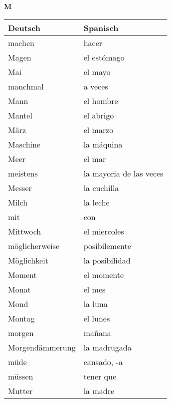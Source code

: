 \begin{flushright}\begin{Huge}\textbf{M}\end{Huge}\end{flushright}

\begin{longtable}{p{} p{}} 
\textbf{Deutsch}     & \textbf{Spanisch}                                       \\ \hline
\hline
\endhead %
machen & hacer\\
Magen & el estómago\\
Mai & el mayo\\
manchmal & a veces\\
Mann & el hombre\\
Mantel & el abrigo\\
März & el marzo\\
Maschine & la máquina\\
Meer & el mar\\
meistens & la mayoria de las veces\\
Messer & la cuchilla\\
Milch & la leche\\
mit & con\\
Mittwoch & el miercoles\\
möglicherweise & posibilemente\\
Möglichkeit & la posibilidad\\
Moment & el momente \\
Monat & el mes\\
Mond & la luna\\
Montag & el lunes \\
morgen & mañana\\
Morgendämmerung & la madrugada\\
müde & cansado, -a\\
müssen & tener que\\
Mutter & la madre\\

\end{longtable}
